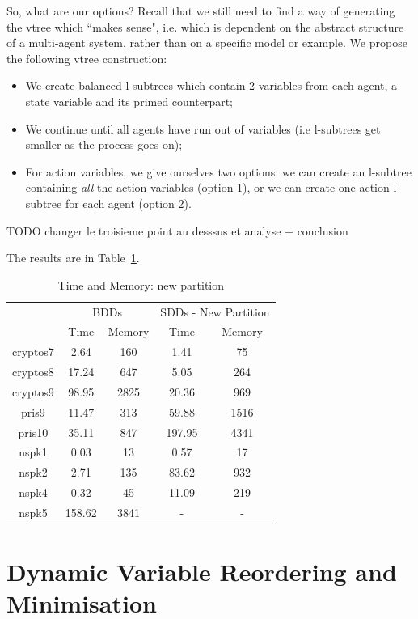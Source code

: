 \documentclass[11pt]{report}
\begin{document}
So, what are our options? Recall that we still need to find a way of generating the vtree which ``makes sense", i.e. which is dependent on the abstract structure of a multi-agent system, rather than on a specific model or example. 
We propose the following vtree construction:
\begin{itemize}
\item We create balanced l-subtrees which contain 2 variables from each agent, a state variable and its primed counterpart;
\item We continue until all agents have run out of variables (i.e l-subtrees get smaller as the process goes on);
\item For action variables, we give ourselves two options: we can create an l-subtree containing \textit{all }the action variables (option 1), or we can create one action l-subtree for each agent (option 2). 
\end{itemize}

TODO changer le troisieme point au desssus et analyse + conclusion

The results are in Table~\ref{table:newpartition}.
\begin{table}
\centering
\begin{tabular}{|*{5}{c|}}
\hline
 & \multicolumn{2}{c|}{BDDs} & \multicolumn{2}{c|}{SDDs - New Partition } \\ \cline{2-5}
 & Time & Memory & Time & Memory \\ \hline
cryptos7 &2.64& 160& 1.41 & 75 \\ \hline
cryptos8 &17.24& 647& 5.05 & 264 \\ \hline
cryptos9 &98.95 &2825& 20.36 & 969 \\ \hline
pris9 &11.47 &313& 59.88 & 1516 \\ \hline
pris10 &35.11& 847& 197.95 & 4341 \\ \hline
nspk1 &0.03& 13 & 0.57 & 17 \\ \hline
nspk2 &2.71& 135& 83.62 & 932 \\ \hline
nspk4 &0.32& 45 & 11.09 & 219 \\ \hline
nspk5 &158.62& 3841& - &-  \\ \hline
\end{tabular}
\caption{Time and Memory: new partition}
\label{table:newpartition}
\end{table}


\section{Dynamic Variable Reordering and Minimisation}
\end{document}
